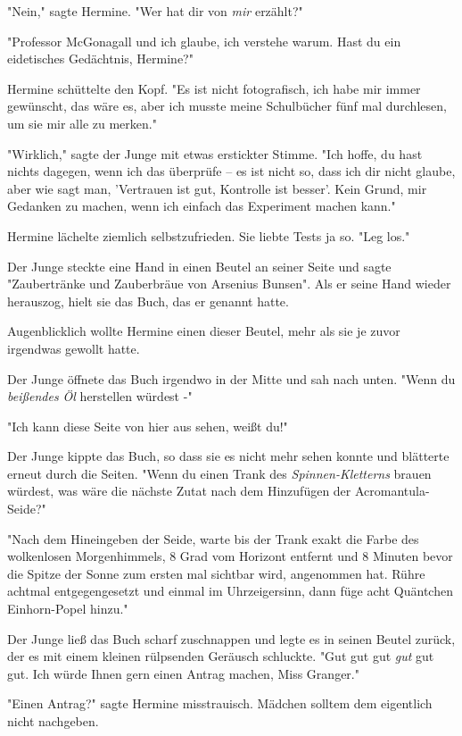 {"Nein," sagte Hermine. "Wer hat dir von \emph{mir} erzählt?"

"Professor McGonagall und ich glaube, ich verstehe warum. Hast du ein eidetisches Gedächtnis, Hermine?"

Hermine schüttelte den Kopf. "Es ist nicht fotografisch, ich habe mir immer gewünscht, das wäre es, aber ich musste meine Schulbücher fünf mal durchlesen, um sie mir alle zu merken."

"Wirklich," sagte der Junge mit etwas erstickter Stimme. "Ich hoffe, du hast nichts dagegen, wenn ich das überprüfe -- es ist nicht so, dass ich dir nicht glaube, aber wie sagt man, 'Vertrauen ist gut, Kontrolle ist besser'. Kein Grund, mir Gedanken zu machen, wenn ich einfach das Experiment machen kann."

Hermine lächelte ziemlich selbstzufrieden. Sie liebte Tests ja so. "Leg los."

Der Junge steckte eine Hand in einen Beutel an seiner Seite und sagte "Zaubertränke und Zauberbräue von Arsenius Bunsen". Als er seine Hand wieder herauszog, hielt sie das Buch, das er genannt hatte.

Augenblicklich wollte Hermine einen dieser Beutel, mehr als sie je zuvor irgendwas gewollt hatte.

Der Junge öffnete das Buch irgendwo in der Mitte und sah nach unten. "Wenn du \emph{beißendes Öl} herstellen würdest -"

"Ich kann diese Seite von hier aus sehen, weißt du!"

Der Junge kippte das Buch, so dass sie es nicht mehr sehen konnte und blätterte erneut durch die Seiten. "Wenn du einen Trank des \emph{Spinnen-Kletterns} brauen würdest, was wäre die nächste Zutat nach dem Hinzufügen der Acromantula-Seide?"

"Nach dem Hineingeben der Seide, warte bis der Trank exakt die Farbe des wolkenlosen Morgenhimmels, 8 Grad vom Horizont entfernt und 8 Minuten bevor die Spitze der Sonne zum ersten mal sichtbar wird, angenommen hat. Rühre achtmal entgegengesetzt und einmal im Uhrzeigersinn, dann füge acht Quäntchen Einhorn-Popel hinzu."

Der Junge ließ das Buch scharf zuschnappen und legte es in seinen Beutel zurück, der es mit einem kleinen rülpsenden Geräusch schluckte. "Gut gut gut \emph{gut} gut gut. Ich würde Ihnen gern einen Antrag machen, Miss Granger."

"Einen Antrag?" sagte Hermine misstrauisch. Mädchen solltem dem eigentlich nicht nachgeben.

}

